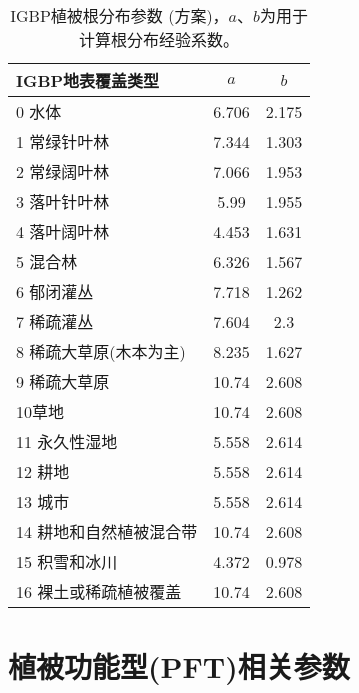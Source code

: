 \begin{table}[]
\centering
\caption{IGBP植被根分布参数 (\citet{zeng2001global}方案)，$a$、$b$为用于计算根分布经验系数。}
\label{tab:IGBP植被根分布参数zeng方案}
\begin{tabular}{@{}lcc@{}}
\toprule
IGBP地表覆盖类型     & $a$ & $b$ \\ \midrule
0 水体            & 6.706           & 2.175 \\ \midrule
1 常绿针叶林       & 7.344          & 1.303          \\
2 常绿阔叶林       & 7.066          & 1.953          \\
3 落叶针叶林       & 5.99           & 1.955          \\
4 落叶阔叶林       & 4.453          & 1.631          \\
5 混合林         & 6.326          & 1.567          \\
6 郁闭灌丛        & 7.718          & 1.262          \\
7 稀疏灌丛        & 7.604          & 2.3            \\
8 稀疏大草原(木本为主) & 8.235          & 1.627          \\
9 稀疏大草原       & 10.74          & 2.608          \\
10草地          & 10.74          & 2.608          \\
11 永久性湿地      & 5.558          & 2.614          \\
12 耕地         & 5.558          & 2.614          \\
13 城市         & 5.558          & 2.614          \\
14 耕地和自然植被混合带 & 10.74          & 2.608          \\
15 积雪和冰川      & 4.372          & 0.978          \\
16 裸土或稀疏植被覆盖  & 10.74          & 2.608          \\ \bottomrule
\end{tabular}
\end{table}


\chapter{植被功能型(PFT)相关参数}\label{植被功能型PFT相关参数}

